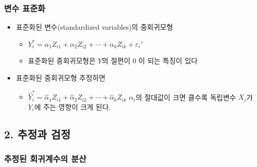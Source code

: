 \documentclass[
]{article}
\providecommand{\tightlist}{%
  \setlength{\itemsep}{0pt}\setlength{\parskip}{0pt}}
\begin{document}
\hypertarget{uxbcc0uxc218-uxd45cuxc900uxd654}{%
\subsubsection{변수 표준화}\label{uxbcc0uxc218-uxd45cuxc900uxd654}}

\begin{itemize}
\tightlist
\item
  표준화된 변수(standardized variables)의 중회귀모형

  \begin{itemize}
  \tightlist
  \item
    \(Y_i^*=\alpha_1 Z_{i1} + \alpha_2 Z_{i2} + \cdots + \alpha_k Z_{ik} + \varepsilon_i'\)
  \item
    표준화된 중회귀모형은 \(Y\)의 절편이 \(0\) 이 되는 특징이 있다
  \end{itemize}
\item
  표준화된 중회귀모형 추정하면

  \begin{itemize}
  \tightlist
  \item
    \(\hat{Y}_i^*=\hat{\alpha}_1 Z_{i1} + \hat{\alpha}_2 Z_{i2} + \cdots + \hat{\alpha}_k Z_{ik}\)
    \(\alpha_i\)의 절대값이 크면 클수록 독립변수 \(X_i\)가 \(Y_i\)에
    주는 영향이 크게 된다.
  \end{itemize}
\end{itemize}

\hypertarget{uxcd94uxc815uxacfc-uxac80uxc815}{%
\subsection{2. 추정과 검정}\label{uxcd94uxc815uxacfc-uxac80uxc815}}

\hypertarget{uxcd94uxc815uxb41c-uxd68cuxadc0uxacc4uxc218uxc758-uxbd84uxc0b0}{%
\subsubsection{추정된 회귀계수의
분산}\label{uxcd94uxc815uxb41c-uxd68cuxadc0uxacc4uxc218uxc758-uxbd84uxc0b0}}
\end{document}

